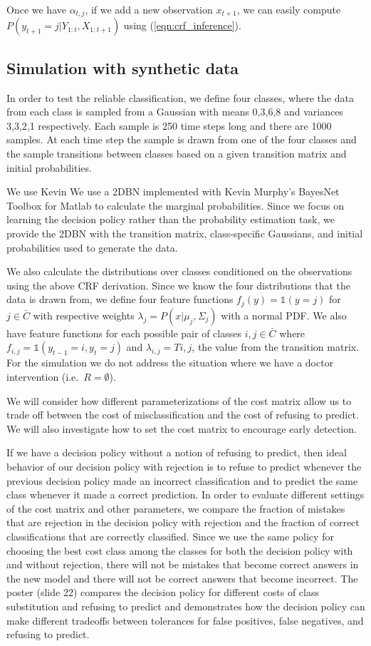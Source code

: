 \documentclass[12pt,solutions]{article}
\newcommand{\one}{\mathbb{1}}
\begin{document}
Once we have $\alpha_{t,j} $, if we add a new observation $x_{t+1}$, we can easily compute $P(y_{t+1}=j | Y_{1:t}, X_{1:t+1})$ using (\ref{eqn:crf_inference}).

\subsection{Simulation with synthetic data}

In order to test the reliable classification, we define four classes, where the data from each class is sampled from a Gaussian with means 0,3,6,8 and variances 3,3,2,1 respectively. Each sample is 250 time steps long and there are 1000 samples. At each time step the sample is drawn from one of the four classes and the sample transitions between classes based on a given transition matrix and initial probabilities.


We use Kevin We use a 2DBN implemented with Kevin Murphy's BayesNet Toolbox for Matlab to calculate the marginal probabilities. Since we focus on learning the decision policy rather than the probability estimation task, we provide the 2DBN with the transition matrix, class-specific Gaussians, and initial probabilities used to generate the data.

We also calculate the distributions over classes conditioned on the observations using the above CRF derivation. Since we know the four distributions that the data is drawn from, we define four feature functions $f_j(y) = \one(y=j)$ for $j \in \bar{C}$ with respective weights $\lambda_j = P(x | \mu_j, \Sigma_j)$ with a normal PDF.  We also have feature functions for each possible pair of classes $i,j \in \bar{C}$ where  $f_{i,j} = \one(y_{t-1}=i,y_t=j)$ and $\lambda_{i,j} = Ti,j$, the value from the transition matrix. For the simulation we do not address the situation where we have a doctor intervention (i.e.\ $R=\emptyset$). 

We will consider how different parameterizations of the cost matrix allow us to trade off between the cost of misclassification and the cost of refusing to predict. We will also investigate how to set the cost matrix to encourage early detection.

If we have a decision policy without a notion of refusing to predict, then ideal behavior of our decision policy with rejection is to refuse to predict whenever the previous decision policy made an incorrect classification and to predict the same class whenever it made a correct prediction. In order to evaluate different settings of the cost matrix and other parameters, we compare the fraction of mistakes that are rejection in the decision policy with rejection and the fraction of correct classifications that are correctly classified. Since we use the same policy for choosing the best cost class among the classes for both the decision policy with and without rejection, there will not be mistakes that become correct answers in the new model and there will not be correct answers that become incorrect. The poster (slide 22) compares the decision policy for different costs of class substitution and refusing to predict and demonstrates how the decision policy can make different tradeoffs between tolerances for false positives, false negatives, and refusing to predict.
\end{document}
